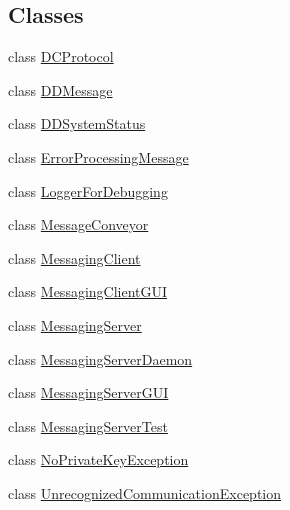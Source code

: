 \subsection*{Classes}
\begin{DoxyCompactItemize}
\item 
class \hyperlink{classgov_1_1fnal_1_1ppd_1_1dd_1_1chat_1_1DCProtocol}{D\-C\-Protocol}
\item 
class \hyperlink{classgov_1_1fnal_1_1ppd_1_1dd_1_1chat_1_1DDMessage}{D\-D\-Message}
\item 
class \hyperlink{classgov_1_1fnal_1_1ppd_1_1dd_1_1chat_1_1DDSystemStatus}{D\-D\-System\-Status}
\item 
class \hyperlink{classgov_1_1fnal_1_1ppd_1_1dd_1_1chat_1_1ErrorProcessingMessage}{Error\-Processing\-Message}
\item 
class \hyperlink{classgov_1_1fnal_1_1ppd_1_1dd_1_1chat_1_1LoggerForDebugging}{Logger\-For\-Debugging}
\item 
class \hyperlink{classgov_1_1fnal_1_1ppd_1_1dd_1_1chat_1_1MessageConveyor}{Message\-Conveyor}
\item 
class \hyperlink{classgov_1_1fnal_1_1ppd_1_1dd_1_1chat_1_1MessagingClient}{Messaging\-Client}
\item 
class \hyperlink{classgov_1_1fnal_1_1ppd_1_1dd_1_1chat_1_1MessagingClientGUI}{Messaging\-Client\-G\-U\-I}
\item 
class \hyperlink{classgov_1_1fnal_1_1ppd_1_1dd_1_1chat_1_1MessagingServer}{Messaging\-Server}
\item 
class \hyperlink{classgov_1_1fnal_1_1ppd_1_1dd_1_1chat_1_1MessagingServerDaemon}{Messaging\-Server\-Daemon}
\item 
class \hyperlink{classgov_1_1fnal_1_1ppd_1_1dd_1_1chat_1_1MessagingServerGUI}{Messaging\-Server\-G\-U\-I}
\item 
class \hyperlink{classgov_1_1fnal_1_1ppd_1_1dd_1_1chat_1_1MessagingServerTest}{Messaging\-Server\-Test}
\item 
class \hyperlink{classgov_1_1fnal_1_1ppd_1_1dd_1_1chat_1_1NoPrivateKeyException}{No\-Private\-Key\-Exception}
\item 
class \hyperlink{classgov_1_1fnal_1_1ppd_1_1dd_1_1chat_1_1UnrecognizedCommunicationException}{Unrecognized\-Communication\-Exception}
\end{DoxyCompactItemize}
